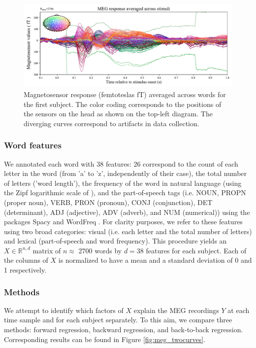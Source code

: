 \begin{figure}
  \centering
  \includegraphics[width=\textwidth, trim=0cm 0cm 0cm 0cm, clip=True]{figures/meg_sensors.pdf}
  \caption{Magnetosensor response (femtoteslas fT) averaged across words for the first subject. The color coding corresponds to the positions of the sensors on the head as shown on the top-left diagram. The diverging curves correspond to artifacts in data collection.}
  \label{fig:megavg}
\end{figure}

\subsubsection{Word features} We annotated each word with 38 features: 26
correspond to the count of each letter in the word (from 'a' to 'z',
independently of their case), the total number of letters ('word length'), the
frequency of the word in natural language (using the Zipf logarithmic scale
of \citep{van2014subtlex}), and the part-of-speech tags (i.e. NOUN, PROPN (proper
noun), VERB, PRON (pronoun), CONJ (conjunction), DET (determinant), ADJ
(adjective), ADV (adverb), and NUM (numerical)) using the packages Spacy
\citep{spacy2} and WordFreq \citep{speerwordfreq}. For clarity purposes, we refer to these
features using two broad categories: visual (i.e. each letter and the total
number of letters) and lexical (part-of-speech and word frequency).  This
procedure yields an $X \in \mathbb{R}^{n, d}$ matrix of $n\approx$ 2700 words by
$d=38$ features for each subject. Each of the columns of $X$ is normalized to
have a mean and a standard deviation of 0 and 1 respectively.

\subsubsection{Methods}

We attempt to identify which factors of $X$ explain the MEG
recordings $Y$ at each time sample and for each subject separately. To this aim,
we compare three methods: forward regression, backward regression, and back-to-back regression.
Corresponding results can be found in Figure \ref{fig:meg_twocurves}.

